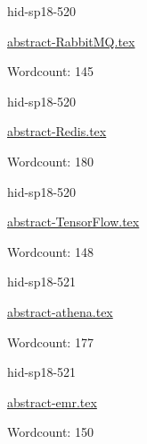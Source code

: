 

\begin{IU}

hid-sp18-520

\href{https://github.com/cloudmesh-community/hid-sp18-520/blob/master//technology/abstract-RabbitMQ.tex}{abstract-RabbitMQ.tex}

 

Wordcount: 145

\end{IU}



\begin{IU}

hid-sp18-520

\href{https://github.com/cloudmesh-community/hid-sp18-520/blob/master//technology/abstract-Redis.tex}{abstract-Redis.tex}

 

Wordcount: 180

\end{IU}



\begin{IU}

hid-sp18-520

\href{https://github.com/cloudmesh-community/hid-sp18-520/blob/master//technology/abstract-TensorFlow.tex}{abstract-TensorFlow.tex}

 

Wordcount: 148

\end{IU}



\begin{IU}

hid-sp18-521

\href{https://github.com/cloudmesh-community/hid-sp18-521/blob/master//technology/abstract-athena.tex}{abstract-athena.tex}

 

Wordcount: 177

\end{IU}



\begin{IU}

hid-sp18-521

\href{https://github.com/cloudmesh-community/hid-sp18-521/blob/master//technology/abstract-emr.tex}{abstract-emr.tex}

 

Wordcount: 150

\end{IU}


